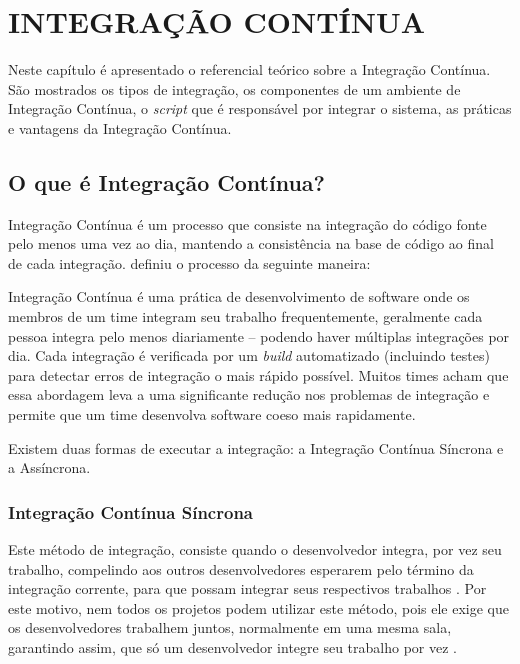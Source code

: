 \chapter{INTEGRAÇÃO CONTÍNUA}

Neste capítulo é apresentado o referencial teórico sobre a Integração Contínua. São mostrados os tipos de integração, os componentes de um ambiente de Integração Contínua, o \textit{script} que é responsável por integrar o sistema, as práticas e vantagens da Integração Contínua.

\section{O que é Integração Contínua?}
Integração Contínua é um processo que consiste na integração do código fonte pelo menos uma vez ao dia, mantendo a consistência na base de código ao final de cada integração.  definiu o processo da seguinte maneira:

\begin{citacao}
Integração Contínua é uma prática de desenvolvimento de software onde os membros de um time integram seu trabalho frequentemente, geralmente cada pessoa integra pelo menos diariamente – podendo haver múltiplas integrações por dia. Cada integração é verificada por um \textit{build} automatizado (incluindo testes) para detectar erros de integração o mais rápido possível. Muitos times acham que essa abordagem leva a uma significante redução nos problemas de integração e permite que um time desenvolva software coeso mais rapidamente.
\end{citacao}

Existem duas formas de executar a integração: a Integração Contínua Síncrona e a Assíncrona.

\subsection{Integração Contínua Síncrona}

Este método de integração, consiste quando o desenvolvedor integra, por vez seu trabalho, compelindo aos outros desenvolvedores esperarem pelo término da integração corrente, para que possam integrar seus respectivos trabalhos \cite{IMPROVEIT-INTEGRACAO}. Por este motivo, nem todos os projetos podem utilizar este método, pois ele exige que os desenvolvedores trabalhem juntos, normalmente em uma mesma sala, garantindo assim, que só um desenvolvedor integre seu trabalho por vez \cite{IMPROVEIT-INTEGRACAO}.

